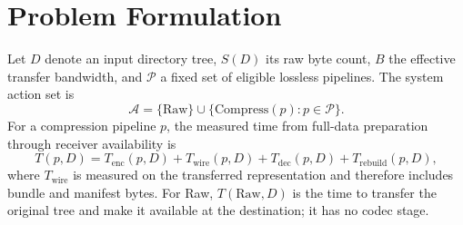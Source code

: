 \documentclass[smallabstract,smallcaptions]{dccpaper}
\renewcommand{\Section}[1]{\vspace*{-0.05in}\section{#1}\vspace{0.025in}}
\begin{document}
\Section{Problem Formulation}

Let $D$ denote an input directory tree, $S(D)$ its raw byte count, $B$ the effective transfer bandwidth, and $\mathcal{P}$ a fixed set of eligible lossless pipelines. The system action set is
\begin{equation}
\mathcal{A}=\{\mathrm{Raw}\}\cup\{\mathrm{Compress}(p):p\in\mathcal{P}\}.
\end{equation}
For a compression pipeline $p$, the measured time from full-data preparation through receiver availability is
\begin{equation}
T(p,D)=T_{\mathrm{enc}}(p,D)+T_{\mathrm{wire}}(p,D)
       +T_{\mathrm{dec}}(p,D)+T_{\mathrm{rebuild}}(p,D),
\end{equation}
where $T_{\mathrm{wire}}$ is measured on the transferred representation and therefore includes bundle and manifest bytes. For Raw, $T(\mathrm{Raw},D)$ is the time to transfer the original tree and make it available at the destination; it has no codec stage.
\end{document}
